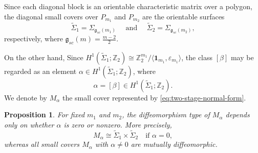 \documentclass{amsart}
\newtheorem{proposition}[theorem]{Proposition}
\numberwithin{equation}{section}
\theoremstyle{definition}
\theoremstyle{remark}
\newcommand{\Z}{\mathbb Z}
\newcommand{\one}{\mathbf 1}
\def\genus{\mathfrak g}
\begin{document}
Since each diagonal block is an orientable characteristic matrix over a polygon, the diagonal small covers over $P_{m_1}$ and $P_{m_2}$ are the orientable surfaces 
$$
    \widetilde{\Sigma}_1=\Sigma_{\genus_{sc}(m_1)} \quad \text{ and } \quad \widetilde{\Sigma}_2=\Sigma_{\genus_{sc}(m_2)},
$$
respectively, where $\genus_{sc}(m)=\frac{m-2}{2}$.

On the other hand, Since $H^1(\widetilde{\Sigma}_1;\Z_2)\cong\Z_2^{m_1}/\langle \one_{m_1},\varepsilon_{m_1}\rangle$, the class $[\beta]$ may be regarded as an element $\alpha\in H^1(\widetilde{\Sigma}_1;\Z_2)$, where
$$
    \alpha=[\beta]\in H^1(\widetilde{\Sigma}_1;\Z_2).
$$
We denote by $M_\alpha$ the small cover represented by \eqref{eq:two-stage-normal-form}.

\begin{proposition}\label{prop:two-stage-diffeomorphism-classification}
    For fixed $m_1$ and $m_2$, the diffeomorphism type of $M_\alpha$ depends only on whether $\alpha$ is zero or nonzero. 
    More precisely,
    $$
        M_\alpha\cong  \widetilde{\Sigma}_1\times \widetilde{\Sigma}_2 \quad\text{if } \alpha=0,
    $$
    whereas all small covers $M_\alpha$ with $\alpha\ne0$ are mutually diffeomorphic.
\end{proposition}
\end{document}
